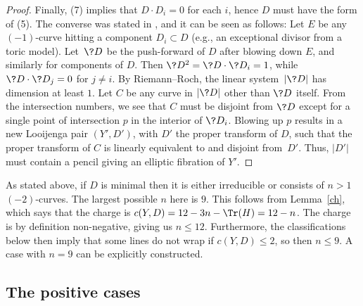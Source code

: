 \begin{proof}
Finally, (7) implies that $D\cdot D_i=0$ for each $i$, hence $D$ must have the form of (5). The converse was stated in \cite[Section~0.5.2, arXiv v1]{GHK1}, and it can be seen as follows: Let $E$ be any $(-1)$-curve hitting a component $D_i\subset D$ (e.g., an exceptional divisor from a toric model). Let~$\?{D}$ be the push-forward of $D$ after blowing down $E$, and similarly for components of $D$. Then $\?{D}^2=\?{D}\cdot \?{D}_i=1$, while $\?{D}\cdot \?{D}_j=0$ for $j\neq i$. By Riemann--Roch, the linear system~$|\?{D}|$ has dimension at least $1$. Let $C$ be any curve in $|\?{D}|$ other than $\?{D}$ itself. From the intersection numbers, we see that $C$ must be disjoint from $\?{D}$ except for a single point of intersection $p$ in the interior of $\?{D}_i$. Blowing up $p$ results in a new Looijenga pair $(Y',D')$, with $D'$ the proper transform of $D$, such that the proper transform of $C$ is linearly equivalent to and disjoint from~$D'$. Thus, $|D'|$ must contain a pencil giving an elliptic fibration of $Y'$.
\end{proof}

As stated above, if $D$ is minimal then it is either irreducible or consists of $n>1$ $(-2)$-curves. The largest possible $n$ here is $9$. This follows from Lemma~\ref{ch}, which says that the charge is $c(Y,D)=12-3n-\Tr(H)=12-n$. The charge is by definition non-negative, giving us $n\leq 12$. Furthermore, the classifications below then imply that some lines do not wrap if $c(Y,D)\leq 2$, so then $n\leq 9$. A case with $n=9$ can be explicitly constructed.

\subsection{The positive cases}\label{PositiveCase}

